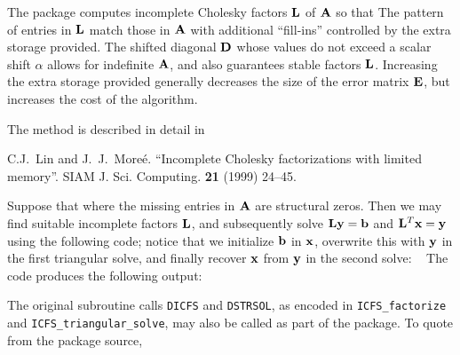 \documentclass{galahad}
\newcommand{\packagename}{ICFS}
\begin{document}

\galmethod
The package computes incomplete Cholesky factors ${\mathbf{L}}$ of ${\mathbf{A}}$ so that
The pattern of entries in ${\mathbf{L}}$ match those in ${\mathbf{A}}$ with additional
``fill-ins'' controlled by the extra storage provided. The shifted diagonal
${\mathbf{D}}$ whose values do not exceed a scalar shift $\alpha$ allows for
indefinite ${\mathbf{A}}$, and also guarantees stable factors ${\mathbf{L}}$. Increasing the
extra storage provided generally decreases the size of the error matrix
${\mathbf{E}}$, but increases the cost of the algorithm.

\vspace*{1mm}

\galreference
\vspace*{1mm}

\noindent
The method is described in detail in
\vspace*{1mm}

\noindent
C.\-J.\ Lin and J.\ J.\ More\'{e}. ``Incomplete Cholesky factorizations
with limited memory''.  SIAM J. Sci. Computing. {\bf 21} (1999) 24--45.


\galexamples
Suppose that
where the missing entries in ${\mathbf{A}}$ are structural zeros. Then we may find
suitable incomplete factors ${\mathbf{L}}$, and subsequently solve
${\mathbf{L}} {\mathbf{y}} = {\mathbf{b}}$ and ${\mathbf{L}}^T {\mathbf{x}} = {\mathbf{y}}$ using the following code;
notice that we initialize ${\mathbf{b}}$ in ${\mathbf{x}}$, overwrite this with ${\mathbf{y}}$ in the
first triangular solve, and finally recover ${\mathbf{x}}$ from ${\mathbf{y}}$
in the second solve:
{\tt \small
\VerbatimInput{\packageexample}
}
\noindent
The code produces the following output:
{\tt \small
\VerbatimInput{\packageresults}
}
\noindent


\galappendix
The original subroutine calls {\tt DICFS} and {\tt DSTRSOL},
as encoded in {\tt \packagename\_factorize} and
{\tt \packagename\_triangular\_solve},
may also be called as part of the package. To quote from the package source,
\end{document}
